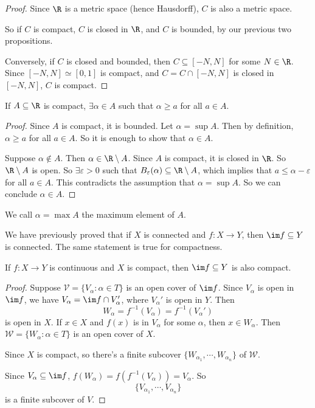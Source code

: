 \documentclass[a4paper]{article}
\begin{document}
\begin{proof}
   Since $\R$ is a metric space (hence Hausdorff), $C$ is also a metric space.

  So if $C$ is compact, $C$ is closed in $\R$, and $C$ is bounded, by our previous two propositions.

  Conversely, if $C$ is closed and bounded, then $C\subseteq [-N, N]$ for some $N\in \R$. Since $[-N, N] \simeq [0, 1]$ is compact, and $C = C\cap [-N, N]$ is closed in $[-N, N]$, $C$ is compact.
\end{proof}

\begin{cor}
  If $A\subseteq \R$ is compact, $\exists \alpha \in A$ such that $\alpha \geq a$ for all $a\in A$.
\end{cor}

\begin{proof}
  Since $A$ is compact, it is bounded. Let $\alpha = \sup A$. Then by definition, $\alpha \geq a$ for all $a\in A$. So it is enough to show that $\alpha \in A$.

  Suppose $\alpha \not\in A$. Then $\alpha \in \R \setminus A$. Since $A$ is compact, it is closed in $\R$. So $\R \setminus A$ is open. So $\exists \varepsilon > 0$ such that $B_\varepsilon(\alpha) \subseteq \R\setminus A$, which implies that $a \leq \alpha - \varepsilon$ for all $a\in A$. This contradicts the assumption that $\alpha = \sup A$. So we can conclude $\alpha\in A$.
\end{proof}

We call $\alpha = \max A$ the maximum element of $A$.

We have previously proved that if $X$ is connected and $f: X\to Y$, then $\im f\subseteq Y$ is connected. The same statement is true for compactness.
\begin{prop}
  If $f: X \to Y$ is continuous and $X$ is compact, then $\im f \subseteq Y$ is also compact.
\end{prop}

\begin{proof}
  Suppose $\mathcal{V} = \{V_\alpha: \alpha \in T\}$ is an open cover of $\im f$. Since $V_\alpha$ is open in $\im f$, we have $V_\alpha = \im f\cap V_\alpha'$, where $V_\alpha'$ is open in $Y$. Then
  \[
    W_\alpha = f^{-1}(V_\alpha) = f^{-1}(V_\alpha')
  \]
  is open in $X$. If $x\in X$  and $f(x)$ is in $V_\alpha$ for some $\alpha$, then $x\in W_\alpha$. Then $\mathcal{W} = \{W_\alpha: \alpha \in T\}$ is an open cover of $X$.

  Since $X$ is compact, so there's a finite subcover $\{W_{\alpha_1}, \cdots, W_{\alpha_n}\}$ of $\mathcal{W}$.

  Since $V_\alpha \subseteq \im f$, $f(W_\alpha) = f(f^{-1}(V_\alpha)) = V_\alpha$. So
  \[
    \{V_{\alpha_1}, \cdots, V_{\alpha_n}\}
  \]
  is a finite subcover of $V$.
\end{proof}
\end{document}
